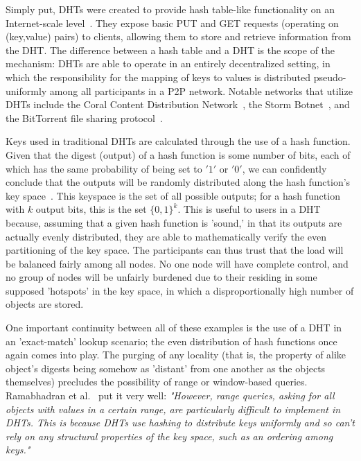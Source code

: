 \documentclass[12pt]{IEEEtran}
\begin{document}
\par Simply put, DHTs were created to provide hash table-like functionality on an Internet-scale level~\cite{Ratnasamy:2001wn}. They expose basic PUT and GET requests (operating on (key,value) pairs) to clients, allowing them to store and retrieve information from the DHT. The difference between a hash table and a DHT is the scope of the mechanism: DHTs are able to operate in an entirely decentralized setting, in which the responsibility for the mapping of keys to values is distributed pseudo-uniformly among all participants in a P2P network. Notable networks that utilize DHTs include the Coral Content Distribution Network~\cite{Freedman:2004vb}, the Storm Botnet~\cite{Holz:2008uk}, and the BitTorrent file sharing protocol~\cite{Cohen:y1_8mBnw}.

\par Keys used in traditional DHTs are calculated through the use of a hash function. Given that the digest (output) of a hash function is some number of bits, each of which has the same probability of being set to $'1'$ or $'0'$, we can confidently conclude that the outputs will be randomly distributed along the hash function's key space~. This keyspace is the set of all possible outputs; for a hash function with $k$ output bits, this is the set $\{0,1\}^k$. This is useful to users in a DHT because, assuming that a given hash function is 'sound,' in that its outputs are actually evenly distributed, they are able to mathematically verify the even partitioning of the key space. The participants can thus trust that the load will be balanced fairly among all nodes. No one node will have complete control, and no group of nodes will be unfairly burdened due to their residing in some supposed 'hotspots' in the key space, in which a disproportionally high number of objects are stored.~

\par One important continuity between all of these examples is the use of a DHT in an 'exact-match' lookup scenario; the even distribution of hash functions once again comes into play. The purging of any locality (that is, the property of alike object's digests being somehow as 'distant' from one another as the objects themselves) precludes the possibility of range or window-based queries. Ramabhadran et al.~ put it very well: \textit{"However, range queries, asking for all objects with values in a certain range, are particularly difficult to implement in DHTs. This is because DHTs use hashing to distribute keys uniformly and so can't rely on any structural properties of the key space, such as an ordering among keys."}
\end{document}
